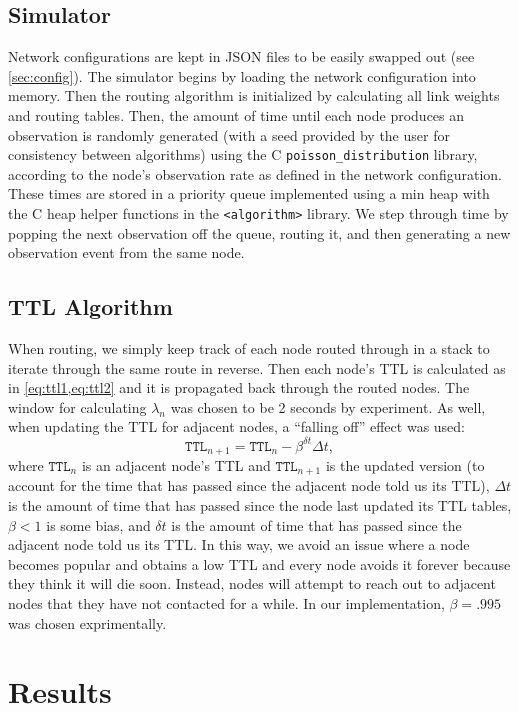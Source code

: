 \documentclass[headings=optiontoheadandtoc,listof=totoc,parskip=full]{scrartcl}
\newcommand{\cpp}{C\nolinebreak\hspace{-.05em}\raisebox{.4ex}{\tiny\bfseries +}\nolinebreak\hspace{-.10em}\raisebox{.4ex}{\tiny\bfseries +}}
\begin{document}
\subsection{Simulator}
Network configurations are kept in JSON files to be easily swapped out (see \cref{sec:config}). The simulator begins by loading the network configuration into memory. Then the routing algorithm is initialized by calculating all link weights and routing tables. Then, the amount of time until each node produces an observation is randomly generated (with a seed provided by the user for consistency between algorithms) using the \cpp{} \texttt{poisson\_distribution} library, according to the node's observation rate as defined in the network configuration. These times are stored in a priority queue implemented using a min heap with the \cpp{} heap helper functions in the \texttt{<algorithm>} library. We step through time by popping the next observation off the queue, routing it, and then generating a new observation event from the same node.

\subsection{TTL Algorithm}
When routing, we simply keep track of each node routed through in a stack to iterate through the same route in reverse. Then each node's TTL is calculated as in \cref{eq:ttl1,eq:ttl2} and it is propagated back through the routed nodes. The window for calculating $\lambda_n$ was chosen to be 2 seconds by experiment. As well, when updating the TTL for adjacent nodes, a ``falling off'' effect was used:
\begin{equation}
    \mathtt{TTL}_{n + 1} = \mathtt{TTL}_n - \beta^{\delta t}\Delta t,
\end{equation}
where $\mathtt{TTL}_n$ is an adjacent node's TTL and $\mathtt{TTL}_{n + 1}$ is the updated version (to account for the time that has passed since the adjacent node told us its TTL), $\Delta t$ is the amount of time that has passed since the node last updated its TTL tables, $\beta < 1$ is some bias, and $\delta t$ is the amount of time that has passed since the adjacent node told us its TTL. In this way, we avoid an issue where a node becomes popular and obtains a low TTL and every node avoids it forever because they think it will die soon. Instead, nodes will attempt to reach out to adjacent nodes that they have not contacted for a while. In our implementation, $\beta = .995$ was chosen exprimentally.

\section{Results}
\end{document}
